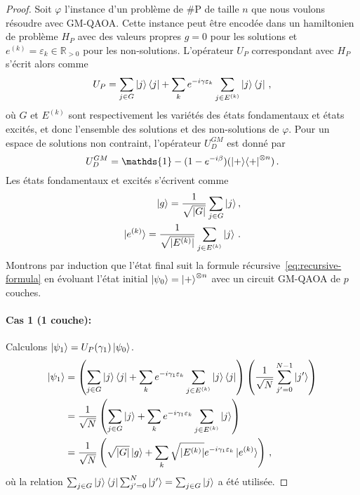 \begin{proof}
    
Soit $\varphi$ l'instance d'un problème de \textsf{\#P} de taille $n$ que nous voulons résoudre avec GM-QAOA. Cette instance peut être encodée dans un hamiltonien de problème $H_{P}$ avec des valeurs propres $g = 0$ pour les solutions et $e^{(k)} = \varepsilon_{k} \in \mathbb{R}_{>0}$ pour les non-solutions. L'opérateur $U_{P}$ correspondant avec $H_{P}$ s'écrit alors comme
\begin{equation}
    U_{P} = \sum_{j \in G} \ket{j}\bra{j} + \sum_{k} e^{-i \gamma \varepsilon_{k}} \sum_{j \in E^{(k)}} \ket{j}\bra{j} \,,
\end{equation} 
où $G$ et $E^{(k)}$ sont respectivement les variétés des états fondamentaux et états excités, et donc l'ensemble des solutions et des non-solutions de $\varphi$. Pour un espace de solutions non contraint, l'opérateur $U_{D}^{GM}$ est donné par
\begin{equation}
    U_{D}^{GM} = \mathds{1} - (1 - e^{-i\beta}) (\ket{+}\!\bra{+}^{\otimes n}) \,.
\end{equation}
Les états fondamentaux et excités s'écrivent comme
\begin{align}
    \ket{g} = \frac{1}{\sqrt{ \lvert G \rvert }} \sum_{j \in G} \ket{j}, \\
    \ket{e^{(k)}} = \frac{1}{\sqrt{ \lvert E^{(k)} \rvert }} \sum_{j \in E^{(k)}} \ket{j} \,.
\end{align}
Montrons par induction que l'état final suit la formule récursive~\ref{eq:recursive-formula} en évoluant l'état initial $\ket{\psi_{0}} = \ket{+}^{\otimes n}$ avec un circuit GM-QAOA de $p$ couches. 

\paragraph{Cas 1 (1 couche):} Calculons $\ket{\psi_{1}} = U_{P}(\gamma_{1}) \ket{\psi_{0}}$.
\begin{equation}
\begin{aligned}
    \ket{\psi_{1}} & = \left(\sum_{j \in G} \ket{j}\bra{j} + \sum_{k} e^{-i \gamma_{1} \varepsilon_{k}} \sum_{j \in E^{(k)}} \ket{j}\bra{j} \right) \left( \frac{1}{ \sqrt{ N }} \sum_{j'=0}^{N-1} \ket{j'} \right) \\
    & = \frac{1}{ \sqrt{ N }} \left( \sum_{j \in G} \ket{j} + \sum_{k} e^{-i \gamma_{1} \varepsilon_{k}} \sum_{j \in E^{(k)}} \ket{j} \right) \\
    & = \frac{1}{ \sqrt{ N }} \left( \sqrt{ \lvert G \rvert  } \ket{g} + \sum_{k} \sqrt{ \lvert E^{(k)} \rvert  } e^{-i \gamma_{1} \varepsilon_{k}} \ket{e^{(k)}} \right) \,,
\end{aligned}
\end{equation}
où la relation $\sum_{j \in G}\ket{j}\bra{j} \sum_{j'=0}^{N} \ket{j'} = \sum_{j \in G} \ket{j}$ a été utilisée.


\end{proof}
